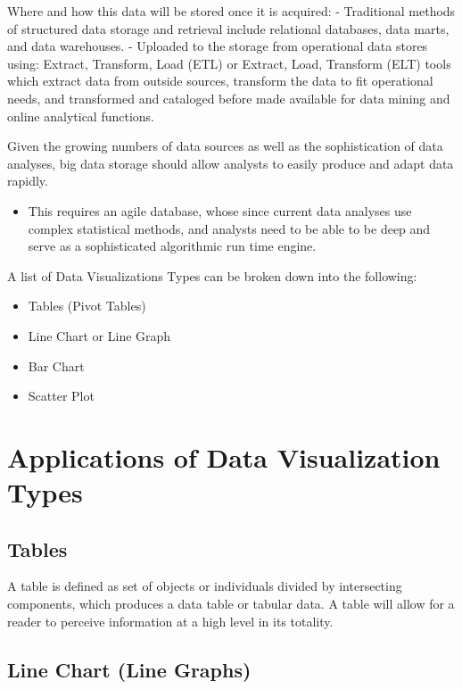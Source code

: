 \documentclass[print]{nuthesis}
\providecommand{\tightlist}{%
  \setlength{\itemsep}{0pt}\setlength{\parskip}{0pt}}
\begin{document}
Where and how this data will be stored once it is acquired:
- Traditional methods of structured data storage and retrieval include relational databases, data marts, and data warehouses.
- Uploaded to the storage from operational data stores using: Extract, Transform, Load (ETL) or Extract, Load, Transform (ELT) tools which extract data from outside sources, transform the data to fit operational needs, and transformed and cataloged before made available for data mining and online analytical functions.

Given the growing numbers of data sources as well as the sophistication of data analyses, big data storage should allow analysts to easily produce and adapt data rapidly.

\begin{itemize}
\tightlist
\item
  This requires an agile database, whose since current data analyses use complex statistical methods, and analysts need to be able to be deep and serve as a sophisticated algorithmic run time engine.
\end{itemize}

A list of Data Visualizations Types can be broken down into the following:

\begin{itemize}
\tightlist
\item
  Tables (Pivot Tables)
\item
  Line Chart or Line Graph
\item
  Bar Chart
\item
  Scatter Plot
\end{itemize}

\hypertarget{applications-of-data-visualization-types}{%
\section{Applications of Data Visualization Types}\label{applications-of-data-visualization-types}}

\hypertarget{tables}{%
\subsection{Tables}\label{tables}}

A table is defined as set of objects or individuals divided by intersecting components, which produces a data table or tabular data. A table will allow for a reader to perceive information at a high level in its totality.

\hypertarget{line-chart-line-graphs}{%
\subsection{Line Chart (Line Graphs)}\label{line-chart-line-graphs}}
\end{document}

